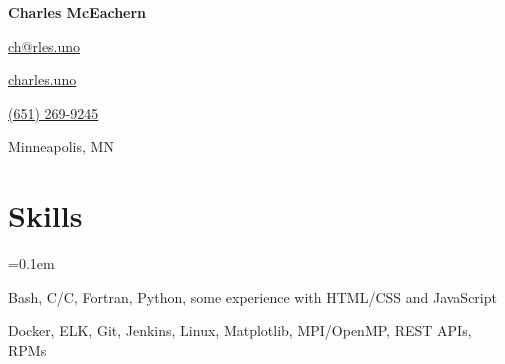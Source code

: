 \documentclass[11pt,letterpaper]{article}
\newcommand{\ResumeSection}[1]{
    \section*{ {\color{MidnightBlue}#1 \sout{\hfill} } }
}
\newcommand{\CPP}{C\nolinebreak[4]\hspace{-.05em}\raisebox{.22ex}{\footnotesize\bf ++}\xspace}
\newcommand{\hbump}{\hspace{0.4in}}
\newcommand{\hbmp}{\hspace{0.02in}}
\newcommand{\iconsize}{8px}
\begin{document}


\begin{center}
    { \Huge \textbf{Charles McEachern} }

    \vspace{12pt}

    
    \hbmp
    \href{mailto:ch@rles.uno}{ch@rles.uno}
    \hbump
    
    \hbmp
    \href{www.charles.uno}{charles.uno}
    \hbump
    
    \hbmp
    \href{tel:+16512699245}{(651) 269-9245}
%    
    \hbump
    
    \hbmp
    Minneapolis, MN

\end{center}


\ResumeSection{Skills}

\begin{description}[leftmargin=!, labelindent=\parindent,
                    labelwidth=\widthof{\bfseries Languages}]
    \parskip=0.1em

    \item[Languages]
        Bash, C/\CPP, Fortran, Python, some experience with HTML/CSS and JavaScript

    \item[Tools]
        Docker, ELK, Git, Jenkins, Linux, Matplotlib, MPI/OpenMP, REST APIs, RPMs

\end{description}


\end{document}

